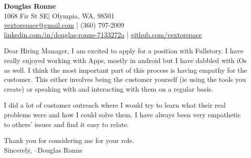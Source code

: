 \documentclass[letter,12pt]{article}
\begin{document}
\begin{center}
    {\Huge \textbf{Douglas Ronne}}\\
    \vspace{2mm}
    1068 Fir St SE| Olympia, WA, 98501\\
    \href{mailto:vextorspace@gmail.com}{vextorspace@gmail.com} | (360) 797-2009\\
    \href{www.linkedin.com/in/douglas-ronne-7133272a}{linkedin.com/in/douglas-ronne-7133272a} | \href{https://github.com/vextorspace}{github.com/vextorspace}
\end{center}

Dear Hiring Manager,
I am excited to apply for a position with Fullstory. I have really enjoyed working with Apps, mostly in android but I have dabbled with iOs as well. I think the most important part of this process is having empathy for the customer. This either involves being the customer yourself (ie using the tools you create) or speaking with and interacting with them on a regular basis.


I did a lot of customer outreach where I would try to learn what their real problems were and how I could solve them. I have always been very empathetic to others' issues and find it easy to relate.

Thank you for considering me for your role.
\\
Sincerely,
--Douglas Ronne
\end{document}
